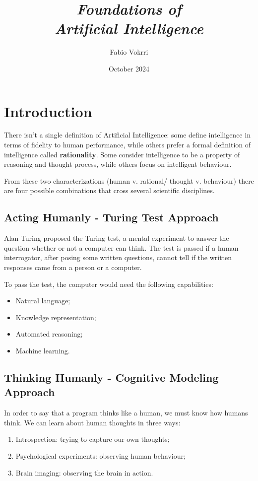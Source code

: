 \documentclass{article}
\title{\huge{\textit{Foundations of \\ Artificial Intelligence}}}
\author{Fabio Vokrri}
\date{October 2024}
\begin{document}
\maketitle
\newpage
\tableofcontents

\newpage
\section{Introduction}
There isn't a single definition of Artificial Intelligence: some define intelligence in terms of fidelity to human performance, while others prefer a formal definition of intelligence called \textbf{rationality}. Some consider intelligence to be a property of reasoning and thought process, while others focus on intelligent behaviour.  

From these two characterizations (human v. rational/ thought v. behaviour) there are four possible combinations that cross several scientific disciplines.

\subsection{Acting Humanly - Turing Test Approach}
Alan Turing proposed the Turing test, a mental experiment to answer the question whether or not a computer can think. The test is passed if a human interrogator, after posing some written questions, cannot tell if the written responses came from a person or a computer.

To pass the test, the computer would need the following capabilities:
\begin{itemize}
    \item Natural language;
    \item Knowledge representation;
    \item Automated reasoning;
    \item Machine learning.
\end{itemize}

\subsection{Thinking Humanly - Cognitive Modeling Approach}
In order to say that a program thinks like a human, we must know how humans think. We can learn about human thoughts in three ways:
\begin{enumerate}
    \item Introspection: trying to capture our own thoughts;
    \item Psychological experiments: observing human behaviour;
    \item Brain imaging: observing the brain in action.
\end{enumerate}
\end{document}
